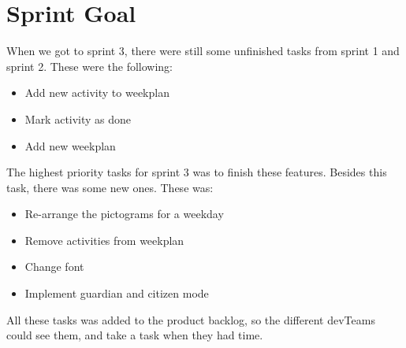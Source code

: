 \section{Sprint Goal}

When we got to sprint 3, there were still some unfinished tasks from sprint 1 and sprint 2. These were the following:
\begin{itemize}
    \item Add new activity to weekplan
    \item Mark activity as done 
    \item Add new weekplan
\end{itemize}

The highest priority tasks for sprint 3 was to finish these features.
Besides this task, there was some new ones. These was:
\begin{itemize}
    \item Re-arrange the pictograms for a weekday
    \item Remove activities from weekplan
    \item Change font
    \item Implement guardian and citizen mode
\end{itemize}

All these tasks was added to the product backlog, so the different \glspl{devTeam} could see them, and take a task when they had time.  